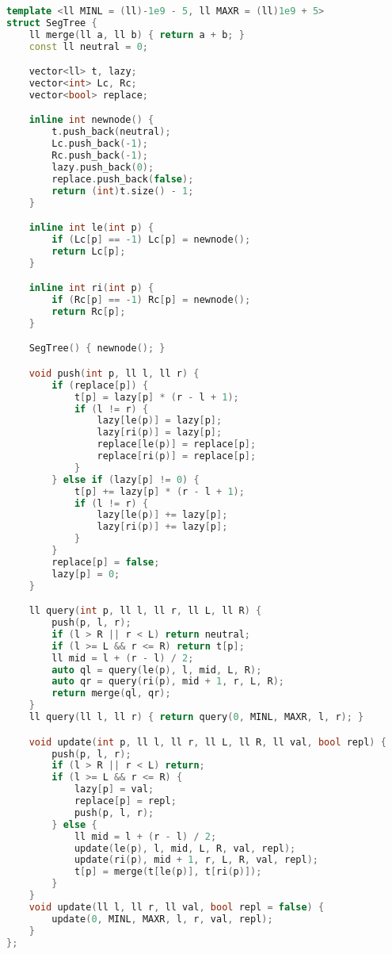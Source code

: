\documentclass[10pt, a4paper, oneside]{book}
\begin{document}
\begin{lstlisting}[language=C++]
template <ll MINL = (ll)-1e9 - 5, ll MAXR = (ll)1e9 + 5>
struct SegTree {
    ll merge(ll a, ll b) { return a + b; }
    const ll neutral = 0;

    vector<ll> t, lazy;
    vector<int> Lc, Rc;
    vector<bool> replace;

    inline int newnode() {
        t.push_back(neutral);
        Lc.push_back(-1);
        Rc.push_back(-1);
        lazy.push_back(0);
        replace.push_back(false);
        return (int)t.size() - 1;
    }

    inline int le(int p) {
        if (Lc[p] == -1) Lc[p] = newnode();
        return Lc[p];
    }

    inline int ri(int p) {
        if (Rc[p] == -1) Rc[p] = newnode();
        return Rc[p];
    }

    SegTree() { newnode(); }

    void push(int p, ll l, ll r) {
        if (replace[p]) {
            t[p] = lazy[p] * (r - l + 1);
            if (l != r) {
                lazy[le(p)] = lazy[p];
                lazy[ri(p)] = lazy[p];
                replace[le(p)] = replace[p];
                replace[ri(p)] = replace[p];
            }
        } else if (lazy[p] != 0) {
            t[p] += lazy[p] * (r - l + 1);
            if (l != r) {
                lazy[le(p)] += lazy[p];
                lazy[ri(p)] += lazy[p];
            }
        }
        replace[p] = false;
        lazy[p] = 0;
    }

    ll query(int p, ll l, ll r, ll L, ll R) {
        push(p, l, r);
        if (l > R || r < L) return neutral;
        if (l >= L && r <= R) return t[p];
        ll mid = l + (r - l) / 2;
        auto ql = query(le(p), l, mid, L, R);
        auto qr = query(ri(p), mid + 1, r, L, R);
        return merge(ql, qr);
    }
    ll query(ll l, ll r) { return query(0, MINL, MAXR, l, r); }

    void update(int p, ll l, ll r, ll L, ll R, ll val, bool repl) {
        push(p, l, r);
        if (l > R || r < L) return;
        if (l >= L && r <= R) {
            lazy[p] = val;
            replace[p] = repl;
            push(p, l, r);
        } else {
            ll mid = l + (r - l) / 2;
            update(le(p), l, mid, L, R, val, repl);
            update(ri(p), mid + 1, r, L, R, val, repl);
            t[p] = merge(t[le(p)], t[ri(p)]);
        }
    }
    void update(ll l, ll r, ll val, bool repl = false) {
        update(0, MINL, MAXR, l, r, val, repl);
    }
};\end{lstlisting}
\hfill
\end{document}
